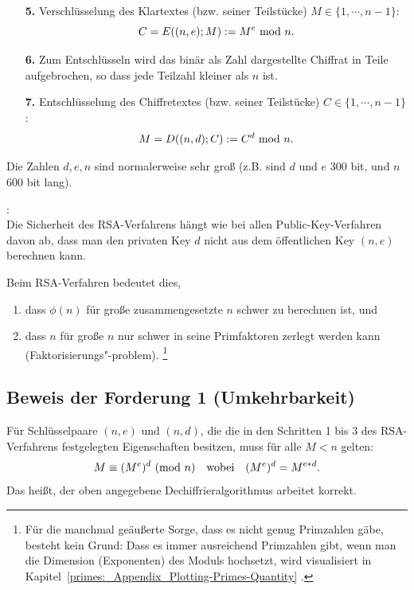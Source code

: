 \begin{refsegment}
\begin{itemize}
\item[\textbf{5.}] Verschlüsselung des Klartextes (bzw. seiner Teilstücke) $M \in \{1, \cdots, n-1\}$:
                $$C = E ((n, e); M ) := M^e {\rm ~mod~} n.$$
\item[\textbf{6.}] Zum Entschlüsseln wird das binär als Zahl dargestellte Chiffrat in Teile
                aufgebrochen, so dass jede Teilzahl kleiner als $n$ ist.
\item[\textbf{7.}] Entschlüsselung des Chiffretextes (bzw. seiner Teilstücke) $C \in \{1, \cdots, n-1\}$:
                $$M = D ( (n, d); C ) := C^d {\rm ~mod~} n.$$
\end{itemize}
Die Zahlen $d, e, n$ sind normalerweise sehr groß (z.B. sind $d$ und $e$ $300$ bit,
und $n$ $600$ bit lang).

\begin{remark}{:}\\
Die Sicherheit des RSA-Verfahrens hängt wie bei allen Public-Key-Verfahren davon ab,
dass man den privaten Key $d$ nicht aus  dem öffentlichen Key $(n,e)$ berechnen kann.
\end{remark}

 Beim RSA-Verfahren bedeutet dies,
\begin{enumerate}
  \item dass $\phi(n)$ für große zusammengesetzte $n$ schwer zu berechnen ist, und
  \item dass $n$ für große $n$ nur schwer in seine Primfaktoren zerlegt werden kann
        (Faktorisierungs"-problem).%
\footnote{%
    Für die manchmal geäußerte Sorge, dass es nicht genug Primzahlen gäbe, besteht
    kein Grund: Dass es immer ausreichend Primzahlen gibt, wenn man die Dimension
    (Exponenten) des Moduls hochsetzt, wird visualisiert in
    Kapitel~\ref{primes:_Appendix_Plotting-Primes-Quantity}
    \glqq {}\grqq.
}
\end{enumerate}


\hypertarget{RSAproof}{}
\subsection{Beweis der Forderung 1 (Umkehrbarkeit)}
\label{RSAproof}

Für Schlüsselpaare $(n, e)$ und $(n, d)$, die die in den Schritten 1 bis 3 des
RSA-Verfahrens festgelegten Eigenschaften besitzen, muss für alle $M < n$
gelten: $$M  \equiv  (M^e)^d  {\rm ~(mod~} n) \quad {\rm wobei} \quad
            (M^e)^d  =  M^{e * d}.$$
Das heißt, der oben angegebene Dechiffrieralgorithmus arbeitet korrekt.


\end{refsegment}

